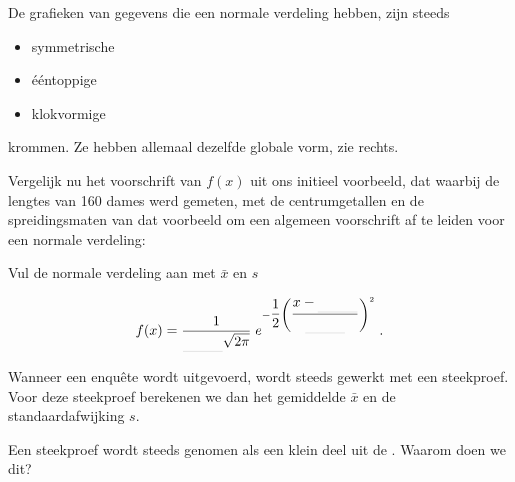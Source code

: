 \documentclass[12pt,twoside]{article}
\begin{document}
{\begin{minipage}{0.5\textwidth}
De grafieken van gegevens die een normale verdeling hebben, zijn steeds
\begin{itemize}
  \item symmetrische
  \item ééntoppige
  \item klokvormige
\end{itemize}
krommen. Ze hebben allemaal dezelfde globale vorm, zie rechts.
\end{minipage}
\begin{minipage}{0.5\textwidth}
\begin{center}
\end{center}
\end{minipage}

Vergelijk nu het voorschrift van $f(x)$ uit ons initieel voorbeeld, dat waarbij de lengtes van 160 dames werd gemeten, met de centrumgetallen en de spreidingsmaten van dat voorbeeld om een algemeen voorschrift af te leiden voor een normale verdeling:

\begin{oefening}
Vul de normale verdeling aan met $\bar{x}$ en $s$

$$f(x)=\dfrac{1}{\arule{1cm}{\sqrt{2\pi}}}\;e^{-\dfrac{1}{2}\left(\dfrac{x-\arule{1cm}}{\arule{1cm}}\right)^2}\;.$$
\end{oefening}

Wanneer een enquête wordt uitgevoerd, wordt steeds gewerkt met een steekproef. Voor deze steekproef berekenen we dan het gemiddelde $\bar{x}$ en de standaardafwijking $s$.

\begin{oefening}
Een steekproef wordt steeds genomen als een klein deel uit de \arule{5cm}. Waarom doen we dit?
\end{oefening}

}
\end{document}
